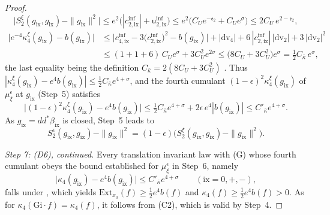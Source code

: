 \documentclass[11pt,letterpaper,reqno]{amsart}
\theoremstyle{definition}
\begin{document}
\begin{proof}
\begin{equation*}
\bigl|S_2^\xi(g_{\mathrm{ix}},g_{\mathrm{ix}})-\|g_{\mathrm{ix}}\|^2\bigr|\le e^2\bigl(|c^{\mathrm{inf}}_{2,\mathrm{ix}}|+\mathsf u^{\mathrm{inf}}_{2,\mathrm{ix}}\bigr)\le e^2\bigl(C_Ue^{-\mathfrak e_2}+C_Ue^\sigma\bigr)\le2C_U\,e^{2-\mathfrak e_2},
\end{equation*}
\begin{align*}
\bigl|e^{-4}\kappa_4^\xi(g_{\mathrm{ix}})-b(g_{\mathrm{ix}})\bigr|&\le\bigl|c^{\mathrm{inf}}_{4,\mathrm{ix}}-3\bigl(c^{\mathrm{inf}}_{2,\mathrm{ix}}\bigr)^2-b(g_{\mathrm{ix}})\bigr|+|\mathrm{dv}_4|+6\,|c^{\mathrm{inf}}_{2,\mathrm{ix}}|\,|\mathrm{dv}_2|+3\,|\mathrm{dv}_2|^2\\
&\le(1+1+6)\,C_Ue^\sigma+3C_U^2e^{2\sigma}\le\bigl(8C_U+3C_U^2\bigr)e^\sigma=\tfrac12C_{\bar\kappa}\,e^\sigma,
\end{align*}
the last equality being the definition $C_{\bar\kappa}=2(8C_U+3C_U^2)$ \cite[Proposition~43.2, Constants]{QEDIII}.
Thus $|\kappa_4^\xi(g_{\mathrm{ix}})-e^4b(g_{\mathrm{ix}})|\le\frac12C_{\bar\kappa}e^{4+\sigma}$, and the fourth cumulant $(1-\epsilon)^2\kappa_4^\xi(g_{\mathrm{ix}})$ of $\mu_\xi^\epsilon$ at $g_{\mathrm{ix}}$ (Step~5) satisfies
\begin{equation*}
\bigl|(1-\epsilon)^2\kappa_4^\xi(g_{\mathrm{ix}})-e^4b(g_{\mathrm{ix}})\bigr|\le\tfrac12C_{\bar\kappa}e^{4+\sigma}+2\epsilon\,e^4|b(g_{\mathrm{ix}})|\le C'_{\bar\kappa}e^{4+\sigma}.
\end{equation*}
As $g_{\mathrm{ix}}=dd^*\beta_{\mathrm{ix}}$ is closed, Step~5 leads to
\begin{equation*}
S_2^\epsilon(g_{\mathrm{ix}},g_{\mathrm{ix}})-\|g_{\mathrm{ix}}\|^2=(1-\epsilon)\bigl(S_2^\xi(g_{\mathrm{ix}},g_{\mathrm{ix}})-\|g_{\mathrm{ix}}\|^2\bigr).
\end{equation*}

\emph{Step 7: (D6), continued.}
Every translation invariant law with (G) whose fourth cumulant obeys the bound established for $\mu_\xi^\epsilon$ in Step~6, namely
\begin{equation*}
\bigl|\kappa_4(g_{\mathrm{ix}})-e^4b(g_{\mathrm{ix}})\bigr|\le C'_{\bar\kappa}e^{4+\sigma}\qquad(\mathrm{ix}=0,+,-),
\end{equation*}
falls under \cite[Chapter~44, Lemma~3.2]{QEDIII}, which yields $\mathrm{Ext}_{x_0}(f)\ge\frac12e^4b(f)$ and $\kappa_4(f)\ge\frac12e^4b(f)>0$.
As for $\kappa_4(\mathrm{Gi}\cdot f)=\kappa_4(f)$, it follows from (C2), which is valid by Step~4.


\end{proof}
\end{document}
